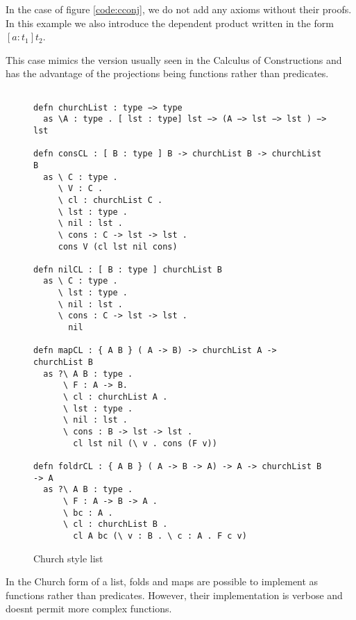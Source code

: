 In the case of figure \ref{code:cconj}, we do not add any axioms without their proofs.   
In this example we also introduce the dependent product written in the form $[ a : t_1 ] t_2$.

This case mimics the version usually seen in the Calculus of Constructions and has the advantage of
the projections being functions rather than predicates.


\begin{figure}[H]
\begin{lstlisting}

defn churchList : type −> type
  as \A : type . [ lst : type] lst −> (A −> lst −> lst ) −> lst

defn consCL : [ B : type ] B -> churchList B -> churchList B
  as \ C : type .
     \ V : C .
     \ cl : churchList C .
     \ lst : type .
     \ nil : lst .
     \ cons : C -> lst -> lst .
     cons V (cl lst nil cons)

defn nilCL : [ B : type ] churchList B
  as \ C : type .
     \ lst : type .
     \ nil : lst .
     \ cons : C -> lst -> lst .
       nil

defn mapCL : { A B } ( A -> B) -> churchList A -> churchList B
  as ?\ A B : type .
      \ F : A -> B.
      \ cl : churchList A .
      \ lst : type .
      \ nil : lst .
      \ cons : B -> lst -> lst .
        cl lst nil (\ v . cons (F v))

defn foldrCL : { A B } ( A -> B -> A) -> A -> churchList B -> A 
  as ?\ A B : type . 
      \ F : A -> B -> A .
      \ bc : A .
      \ cl : churchList B .
        cl A bc (\ v : B . \ c : A . F c v)

\end{lstlisting}
\caption{Church style list}
\label{code:clist}
\end{figure}

In the Church form of a list, folds and maps are possible to implement as functions
rather than predicates. However, their implementation is verbose and doesnt permit
more complex functions.


